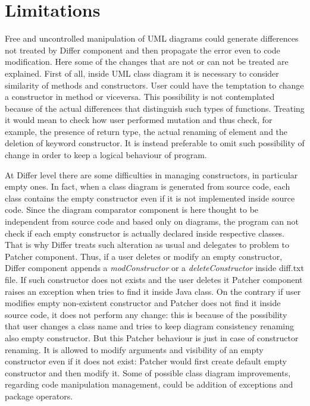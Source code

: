 \section{Limitations}
Free and uncontrolled manipulation of UML diagrams could generate differences not treated by Differ component and then propagate the error even to code modification.
Here some of the changes that are not or can not be treated are explained.
First of all, inside UML class diagram it is necessary to consider similarity of methods and constructors. User could have the temptation to change a constructor in method or viceversa. This possibility is not contemplated because of the actual differences that distinguish such types of functions. Treating it would mean to check how user performed mutation and thus check, for  example, the presence of return type, the actual renaming of element and the deletion of keyword constructor. It is instead preferable to omit such possibility of change in order to keep a logical behaviour of program.

At Differ level there are some difficulties in managing constructors, in particular empty ones. In fact, when a class diagram is generated from source code, each class contains the empty constructor even if it is not implemented inside source code. Since the diagram comparator component is here thought to be independent from source code and based only on diagrams, the program can not check if each empty constructor is actually declared inside respective classes. That is why Differ treats such alteration as usual and delegates to problem to Patcher component. Thus, if a user deletes or modify an empty constructor, Differ component appends a \textit{modConstructor} or a \textit{deleteConstructor} inside diff.txt file. If such constructor does not exists and the user deletes it Patcher component raises an exception when tries to find it inside Java class. On the contrary if user modifies empty non-existent constructor and Patcher does not find it inside source code, it does not perform any change: this is because of the possibility that user changes a class name and tries to keep diagram consistency renaming also empty constructor.
But this Patcher behaviour is just in case of constructor renaming. It is allowed to modify arguments and visibility of an empty constructor even if it does not exist: Patcher would first create default empty constructor and then modify it.
Some of possible class diagram improvements, regarding code manipulation management, could be addition of exceptions and package operators.


